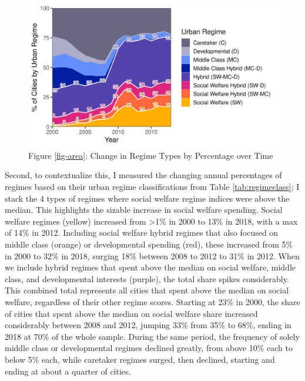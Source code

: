 \documentclass[preprint, 3p,
authoryear]{elsarticle} %
\begin{document}
\begin{figure}
\includegraphics[width=1\linewidth]{viz/percent_area} \caption{Figure \ref{fig-area}\label{fig-area}: Change in Regime Types by Percentage over Time}\label{fig:area}
\end{figure}

\doublespacing

Second, to contextualize this, I measured the changing annual
percentages of regimes based on their urban regime classifications from
Table \ref{tab:regimeclass}; I stack the 4 types of regimes where social
welfare regime indices were above the median. This highlights the
sizable increase in social welfare spending. Social welfare regimes
(yellow) increased from \textgreater1\% in 2000 to 13\% in 2018, with a
max of 14\% in 2012. Including social welfare hybrid regimes that also
focused on middle class (orange) or developmental spending (red), these
increased from 5\% in 2000 to 32\% in 2018, surging 18\% between 2008 to
2012 to 31\% in 2012. When we include hybrid regimes that spent above
the median on social welfare, middle class, and developmental interests
(purple), the total share spikes considerably. This combined total
represents all cities that spent above the median on social welfare,
regardless of their other regime scores. Starting at 23\% in 2000, the
share of cities that spent above the median on social welfare share
increased considerably between 2008 and 2012, jumping 33\% from 35\% to
68\%, ending in 2018 at 70\% of the whole sample. During the same
period, the frequency of solely middle class or developmental regimes
declined greatly, from above 10\% each to below 5\% each, while
caretaker regimes surged, then declined, starting and ending at about a
quarter of cities.
\end{document}
